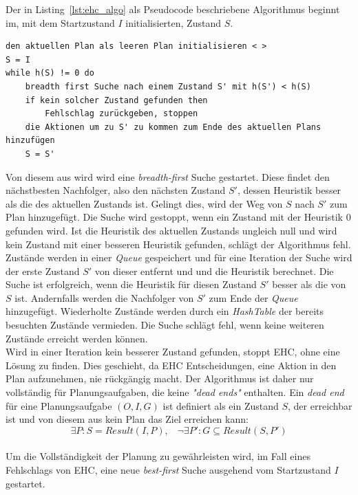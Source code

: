 Der in Listing~\ref{lst:ehc_algo} als Pseudocode beschriebene Algorithmus beginnt im, mit dem Startzustand $I$ initialisierten, Zustand $S$.\\
\begin{minipage}{\linewidth}
\begin{lstlisting}[caption={\acl{EHC} Algorithmus, nach~\cite{hoffmannnebel2001}}, label={lst:ehc_algo}]
den aktuellen Plan als leeren Plan initialisieren < >
S = I
while h(S) != 0 do
    breadth first Suche nach einem Zustand S' mit h(S') < h(S)
    if kein solcher Zustand gefunden then
        Fehlschlag zurückgeben, stoppen
    die Aktionen um zu S' zu kommen zum Ende des aktuellen Plans hinzufügen
    S = S'
\end{lstlisting}
\end{minipage}
Von diesem aus wird wird eine \emph{breadth-first} Suche gestartet.
Diese findet den nächstbesten Nachfolger, also den nächsten Zustand $S'$, dessen Heuristik besser als die des aktuellen Zustands ist.
Gelingt dies, wird der Weg von $S$ nach $S'$ zum Plan hinzugefügt.
Die Suche wird gestoppt, wenn ein Zustand mit der Heuristik 0 gefunden wird.
Ist die Heuristik des aktuellen Zustands ungleich null und wird kein Zustand mit einer besseren Heuristik gefunden, schlägt der Algorithmus fehl.
Zustände werden in einer \emph{Queue} gespeichert und für eine Iteration der Suche wird der erste Zustand $S'$ von dieser entfernt und und die Heuristik berechnet.
Die Suche ist erfolgreich, wenn die Heuristik für diesen Zustand $S'$ besser als die von $S$ ist.
Andernfalls werden die Nachfolger von $S'$ zum Ende der \emph{Queue} hinzugefügt.
Wiederholte Zustände werden durch ein \emph{HashTable} der bereits besuchten Zustände vermieden.
Die Suche schlägt fehl, wenn keine weiteren Zustände erreicht werden können.\\
Wird in einer Iteration kein besserer Zustand gefunden, stoppt \ac{EHC}, ohne eine Lösung zu finden.
Dies geschieht, da \ac{EHC} Entscheidungen, eine Aktion in den Plan aufzunehmen, nie rückgängig macht.
Der Algorithmus ist daher nur vollständig für Planungsaufgaben, die keine \emph{"dead ends"} enthalten.
Ein \emph{dead end} für eine Planungsaufgabe $(O,I,G)$ ist definiert als ein Zustand $S$, der erreichbar ist und von diesem aus kein Plan das Ziel erreichen kann:\\
\[\exists P: S = Result(I,P),\;\;\;\neg\exists P': G\subseteq Result(S,P')\]\\
Um die Vollständigkeit der Planung zu gewährleisten wird, im Fall eines Fehlschlags von \ac{EHC}, eine neue \emph{best-first} Suche ausgehend vom Startzustand $I$ gestartet.
